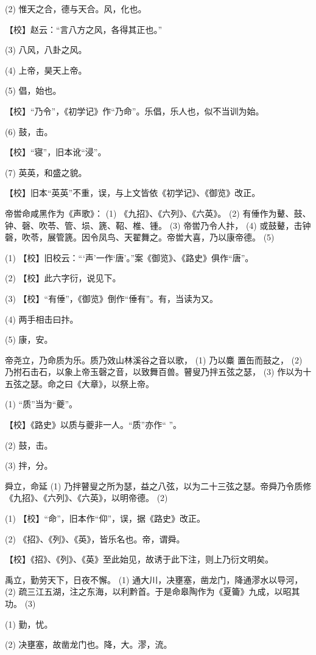 \documentclass[12pt,UTF8]{ctexbook}
\begin{document}
(2) 惟天之合，德与天合。风，化也。

【校】赵云：“言八方之风，各得其正也。”

(3) 八风，八卦之风。

(4) 上帝，昊天上帝。

(5) 倡，始也。

【校】“乃令”，《初学记》作“乃命”。乐倡，乐人也，似不当训为始。

(6) 鼓，击。

【校】“寝”，旧本讹“浸”。

(7) 英英，和盛之貌。

【校】旧本“英英”不重，误，与上文皆依《初学记》、《御览》改正。

帝喾命咸黑作为《声歌》： (1) 《九招》、《六列》、《六英》。 (2) 有倕作为鼙、鼓、钟、磬、吹苓、管、埙、篪、鞀、椎、锺。 (3) 帝喾乃令人抃， (4) 或鼓鼙，击钟磬，吹苓，展管篪。因令凤鸟、天翟舞之。帝喾大喜，乃以康帝德。 (5)

(1) 【校】旧校云：“‘声’一作‘唐’。”案《御览》、《路史》俱作“唐”。

(2) 【校】此六字衍，说见下。

(3) 【校】“有倕”，《御览》倒作“倕有”。有，当读为又。

(4) 两手相击曰抃。

(5) 康，安。

帝尧立，乃命质为乐。质乃效山林溪谷之音以歌， (1) 乃以麋 置缶而鼓之， (2) 乃拊石击石，以象上帝玉磬之音，以致舞百兽。瞽叟乃拌五弦之瑟， (3) 作以为十五弦之瑟。命之曰《大章》，以祭上帝。

(1) “质”当为“夔”。

【校】《路史》以质与夔非一人。“质”亦作“ ”。

(2) 鼓，击。

(3) 拌，分。

舜立，命延 (1) 乃拌瞽叟之所为瑟，益之八弦，以为二十三弦之瑟。帝舜乃令质修《九招》、《六列》、《六英》，以明帝德。 (2)

(1) 【校】“命”，旧本作“仰”，误，据《路史》改正。

(2) 《招》、《列》、《英》，皆乐名也。帝，谓舜。

【校】《招》、《列》、《英》至此始见，故诱于此下注，则上乃衍文明矣。

禹立，勤劳天下，日夜不懈。 (1) 通大川，决壅塞，凿龙门，降通漻水以导河， (2) 疏三江五湖，注之东海，以利黔首。于是命皋陶作为《夏籥》九成，以昭其功。 (3)

(1) 勤，忧。

(2) 决壅塞，故凿龙门也。降，大。漻，流。
\end{document}
